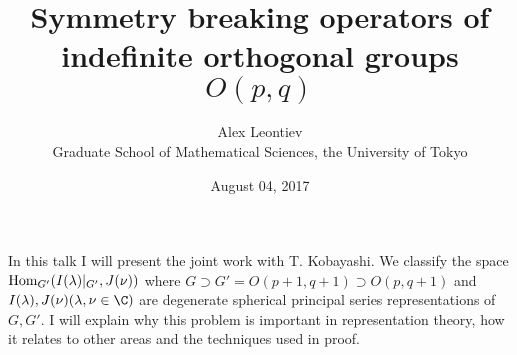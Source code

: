 \documentclass[8pt]{article} %
\title{Symmetry breaking operators of indefinite orthogonal groups $O(p,q)$}
\author{Alex Leontiev\\Graduate School of Mathematical Sciences, the University of Tokyo}
\date{August 04, 2017}
\newcommand{\Hom}{\mbox{\normalfont Hom}}
\theoremstyle{definition}
\begin{document}
\maketitle
In this talk I will present the joint work with T. Kobayashi.
We classify the space $\Hom_{G'}(I(\lambda)\kern-0.1cm\mid_{G'},J(\nu))$ where $G\supset G'=O(p+1,q+1)\supset O(p,q+1)$ and $I(\lambda),J(\nu)(\lambda,\nu\in\C)$ are
degenerate spherical principal series representations of $G,G'$.
I will explain why this problem is important in representation theory, how it relates to other areas
and the techniques used in proof.
\end{document}
